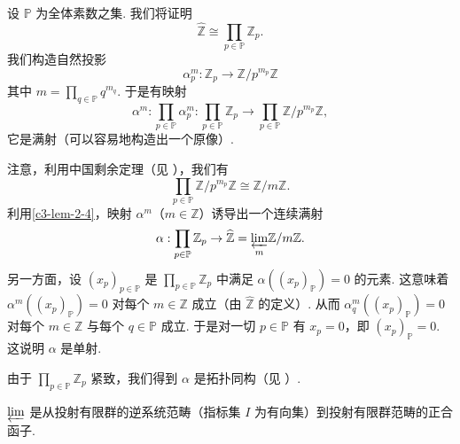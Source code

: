\begin{example}\label{c3-ex-2-2}
设 $\mathbb{P}$ 为全体素数之集. 我们将证明
\[
\widehat{\mathbb{Z}}\cong\prod_{p\in\mathbb{P}}\mathbb{Z}_p.
\]
我们构造自然投影
\[
\alpha^m_p:\mathbb{Z}_p\to\mathbb{Z}/p^{m_p}\mathbb{Z}
\]
其中 $m=\prod_{q\in\mathbb{P}}q^{m_q}$. 于是有映射
\[
\alpha^m:\prod_{p\in\mathbb{P}}\alpha^m_p:\prod_{p\in\mathbb{P}}\mathbb{Z}_p\to\prod_{p\in\mathbb{P}}\mathbb{Z}/p^{m_p}\mathbb{Z},
\]
它是满射（可以容易地构造出一个原像）.

注意，利用中国剩余定理（见 \cite[Corollary~2.2, \S2, Chapter~2]{lang02a}），我们有
\[
\prod_{p\in\mathbb{P}}\mathbb{Z}/p^{m_p}\mathbb{Z}\cong\mathbb{Z}/m\mathbb{Z}.
\]
利用\autoref{c3-lem-2-4}，映射 $\alpha^m$（$m\in\mathbb{Z}$）诱导出一个连续满射
\[
\alpha:\prod_{p\in\mathbb{P}}\mathbb{Z}_p\to\widehat{\mathbb{Z}}={\varprojlim_{m}}\mathbb{Z}/m\mathbb{Z}.
\]
另一方面，设 $(x_p)_{p\in\mathbb{P}}$ 是 $\prod_{p\in\mathbb{P}}\mathbb{Z}_p$ 中满足 $\alpha((x_p)_\mathbb{P})=0$ 的元素. 这意味着 $\alpha^m((x_p)_\mathbb{P})=0$ 对每个 $m\in\mathbb{Z}$ 成立（由 $\widehat{\mathbb{Z}}$ 的定义）. 从而 $\alpha^m_q((x_p)_\mathbb{P})=0$ 对每个 $m\in\mathbb{Z}$ 与每个 $q\in\mathbb{P}$ 成立. 于是对一切 $p\in\mathbb{P}$ 有 $x_p=0$，即 $(x_p)_\mathbb{P}=0$. 这说明 $\alpha$ 是单射.

由于 $\prod_{p\in\mathbb{P}}\mathbb{Z}_p$ 紧致，我们得到 $\alpha$ 是拓扑同构（见 \cite[Theorem~26.6, Chapter~3]{mun75}）.
\end{example}

\begin{proposition}\label{c3-prop-2-12}
$\varprojlim$ 是从投射有限群的逆系统范畴（指标集 $I$ 为有向集）到投射有限群范畴的正合函子.
\end{proposition}


